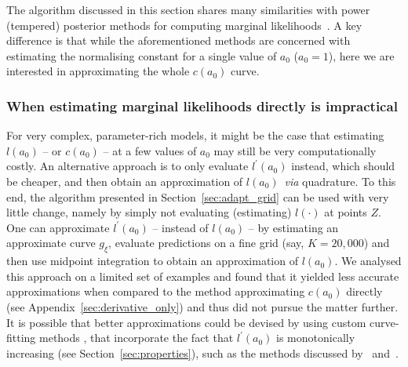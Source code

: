 \documentclass[a4paper, notitlepage, 11pt]{article}
\begin{document}
 The algorithm discussed in this section shares many similarities with power (tempered) posterior methods for computing marginal likelihoods~\citep{Friel2008}.
 A key difference is that while the aforementioned methods are concerned with estimating the normalising constant for a single value of $a_0$ ($a_0 = 1$), here we are interested in approximating the whole $c(a_0)$ curve.



\subsubsection{When estimating marginal likelihoods directly is impractical}
\label{sec:adapt_grid_derivOnly}

For very complex, parameter-rich models, it might be the case that estimating $l(a_0)$ -- or $c(a_0)$ -- at a few values of $a_0$ may still be very computationally costly.
An alternative approach is to only evaluate $l^\prime(a_0)$ instead, which should be cheaper, and then obtain an approximation of $l(a_0)$~\textit{via} quadrature.
To this end, the algorithm presented in Section~\ref{sec:adapt_grid} can be used with very little change, namely by simply not evaluating (estimating) $l(\cdot)$ at points $Z$.
One can approximate $l^\prime(a_0)$ -- instead of $l(a_0)$ -- by estimating an approximate curve $g_\xi$, evaluate predictions on a fine grid (say, $K = 20, 000$) and then use midpoint integration to obtain an approximation of $l(a_0)$.
We analysed this approach on a limited set of examples and found that it yielded less accurate approximations when compared to the method approximating $c(a_0)$ directly (see Appendix~\ref{sec:derivative_only})  and thus did not pursue the matter further.
It is possible that better approximations could be devised by using custom curve-fitting methods , that incorporate the fact that $l^\prime(a_0)$ is monotonically increasing (see Section~\ref{sec:properties}), such as the methods discussed by~\cite{Riihimaki2010} and~\cite{Wang2016}.
\end{document}

